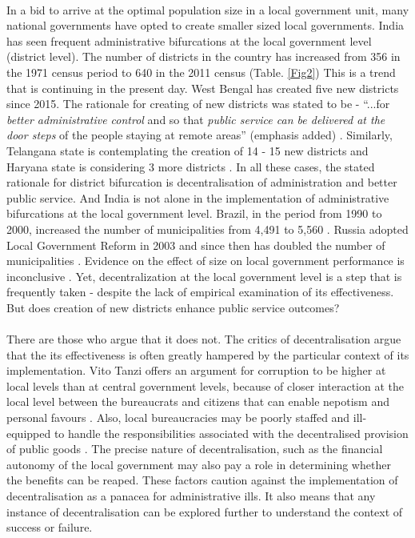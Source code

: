 \documentclass[12pt, a4paper]{article}
\begin{document}
\paragraph{} In a bid to arrive at the optimal population size in a local government unit, many national governments have opted to create smaller sized local governments. India has seen frequent administrative bifurcations at the local government level (district level). The number of districts in the country has increased from 356 in the 1971 census period to 640 in the 2011 census (Table. \ref{Fig2}) This is a trend that is continuing in the present day. West Bengal has created five new districts since 2015. The rationale for creating of new districts was stated to be - ``...for \textit{better administrative control} and so that \textit{public service can be delivered at the door steps} of the people staying at remote areas'' (emphasis added) \parencite{Mamata}. Similarly, Telangana state is contemplating the creation of 14 - 15 new districts \parencite{Telengana} and Haryana state is considering 3 more districts \parencite{Haryana}. In all these cases, the stated rationale for district bifurcation is decentralisation of administration and better public service. And India is not alone in the implementation of administrative bifurcations at the local government level. Brazil, in the period from 1990 to 2000, increased the number of municipalities from 4,491 to 5,560 \parencite{tomio2005creation}. Russia adopted Local Government Reform in 2003 and since then has doubled the number of municipalities \parencite{turgel2008new}\nocite{avellaneda_is_2015}. Evidence on the effect of size on local government performance is inconclusive  \parencite{holzer2009literature}. Yet, decentralization at the local government level is a step that is frequently taken - despite the lack of empirical examination of its effectiveness. But does creation of new districts enhance public service outcomes?

\paragraph{}There are those who argue that it does not. The critics of decentralisation argue that the its effectiveness is often greatly hampered by the particular context of its implementation. Vito Tanzi offers an argument for corruption to be higher at local levels than at central government levels, because of closer interaction at the local level between the bureaucrats and citizens that can enable nepotism and personal favours \parencite{tanzi1996macroeconomic}. Also, local bureaucracies may be poorly staffed and ill-equipped to handle the responsibilities associated with the decentralised provision of public goods \parencite{prud1995dangers}. The precise nature of decentralisation, such as the financial autonomy of the local government may also pay a role in determining whether the benefits can be reaped. These factors caution against the implementation of decentralisation as a panacea for administrative ills. It also means that any instance of decentralisation can be explored further to understand the context of success or failure.
\end{document}
